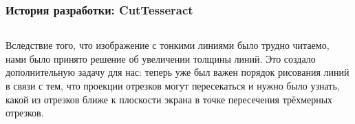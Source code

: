 \documentclass[10pt,pdf,hyperref={unicode}]{beamer}
\begin{document}
\begin{frame}
	\frametitle{История разработки: {\bf CutTesseract}}
	\begin{columns}
		Вследствие того, что изображение с тонкими линиями было
		трудно читаемо, нами было принято решение об увеличении толщины линий.
		Это создало дополнительную задачу для нас: теперь уже был важен
		порядок рисования линий в связи с тем, что проекции отрезков
		могут пересекаться и нужно было узнать, какой из отрезков ближе к 
		плоскости экрана в точке пересечения трёхмерных отрезков.
	\end{columns}
\end{frame}
\end{document}
